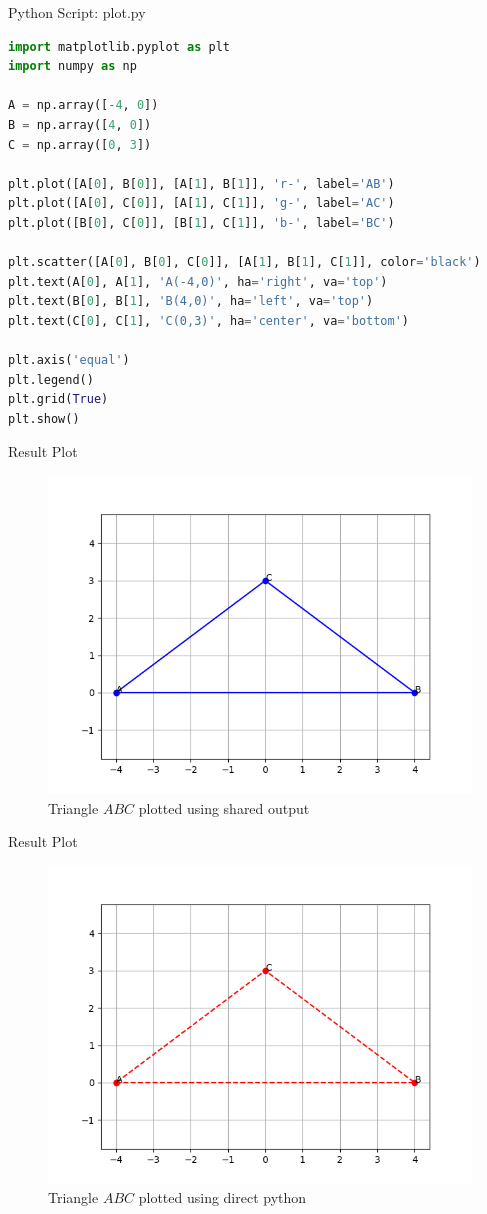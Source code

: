 \documentclass{beamer}
\numberwithin{equation}{section}
\begin{document}
\begin{frame}[fragile]{Python Script: plot.py}
\begin{lstlisting}[language=Python]
import matplotlib.pyplot as plt
import numpy as np

A = np.array([-4, 0])
B = np.array([4, 0])
C = np.array([0, 3])

plt.plot([A[0], B[0]], [A[1], B[1]], 'r-', label='AB')
plt.plot([A[0], C[0]], [A[1], C[1]], 'g-', label='AC')
plt.plot([B[0], C[0]], [B[1], C[1]], 'b-', label='BC')

plt.scatter([A[0], B[0], C[0]], [A[1], B[1], C[1]], color='black')
plt.text(A[0], A[1], 'A(-4,0)', ha='right', va='top')
plt.text(B[0], B[1], 'B(4,0)', ha='left', va='top')
plt.text(C[0], C[1], 'C(0,3)', ha='center', va='bottom')

plt.axis('equal')
plt.legend()
plt.grid(True)
plt.show()
\end{lstlisting}
\end{frame}

\begin{frame}{Result Plot}
\begin{figure}[H]
\centering
\includegraphics[width=0.7\columnwidth]{figs/Figure_1.png}
\caption*{Triangle $ABC$ plotted using shared output}
\end{figure}
\end{frame}
\begin{frame}{Result Plot}
\begin{figure}[H]
\centering
\includegraphics[width=0.7\columnwidth]{figs/Figure_2.png}
\caption*{Triangle $ABC$ plotted using direct python}
\end{figure}
\end{frame}
\end{document}
